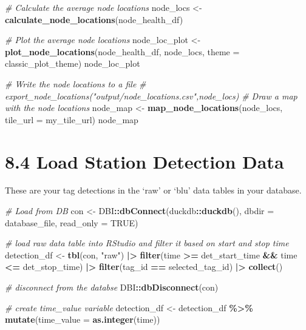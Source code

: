 \documentclass[
]{book}
\newenvironment{Shaded}{\begin{snugshade}}{\end{snugshade}}
\newcommand{\AttributeTok}[1]{\textcolor[rgb]{0.13,0.29,0.53}{#1}}
\newcommand{\CommentTok}[1]{\textcolor[rgb]{0.56,0.35,0.01}{\textit{#1}}}
\newcommand{\ConstantTok}[1]{\textcolor[rgb]{0.56,0.35,0.01}{#1}}
\newcommand{\FunctionTok}[1]{\textcolor[rgb]{0.13,0.29,0.53}{\textbf{#1}}}
\newcommand{\NormalTok}[1]{#1}
\newcommand{\OtherTok}[1]{\textcolor[rgb]{0.56,0.35,0.01}{#1}}
\newcommand{\SpecialCharTok}[1]{\textcolor[rgb]{0.81,0.36,0.00}{\textbf{#1}}}
\newcommand{\StringTok}[1]{\textcolor[rgb]{0.31,0.60,0.02}{#1}}
\begin{document}
\begin{Shaded}
\begin{Highlighting}[]
\CommentTok{\# Calculate the average node locations}
\NormalTok{node\_locs }\OtherTok{\textless{}{-}} \FunctionTok{calculate\_node\_locations}\NormalTok{(node\_health\_df)}

\CommentTok{\# Plot the average node locations}
\NormalTok{node\_loc\_plot }\OtherTok{\textless{}{-}} \FunctionTok{plot\_node\_locations}\NormalTok{(node\_health\_df, }
\NormalTok{                                     node\_locs, }
                                     \AttributeTok{theme =}\NormalTok{ classic\_plot\_theme)}
\NormalTok{node\_loc\_plot}

\CommentTok{\# Write the node locations to a file}
\CommentTok{\# export\_node\_locations("output/node\_locations.csv",node\_locs)}
\CommentTok{\# Draw a map with the node locations}
\NormalTok{node\_map }\OtherTok{\textless{}{-}} \FunctionTok{map\_node\_locations}\NormalTok{(node\_locs, }\AttributeTok{tile\_url =}\NormalTok{ my\_tile\_url)}
\NormalTok{node\_map}
\end{Highlighting}
\end{Shaded}

\section{8.4 Load Station Detection Data}\label{load-station-detection-data}

These are your tag detections in the `raw' or `blu' data tables in your database.

\begin{Shaded}
\begin{Highlighting}[]
\CommentTok{\# Load from DB}
\NormalTok{con }\OtherTok{\textless{}{-}}\NormalTok{ DBI}\SpecialCharTok{::}\FunctionTok{dbConnect}\NormalTok{(duckdb}\SpecialCharTok{::}\FunctionTok{duckdb}\NormalTok{(), }\AttributeTok{dbdir =}\NormalTok{ database\_file, }\AttributeTok{read\_only =} \ConstantTok{TRUE}\NormalTok{)}

\CommentTok{\# load raw data table into RStudio and filter it based on start and stop time}
\NormalTok{detection\_df }\OtherTok{\textless{}{-}} \FunctionTok{tbl}\NormalTok{(con, }\StringTok{"raw"}\NormalTok{) }\SpecialCharTok{|\textgreater{}}
  \FunctionTok{filter}\NormalTok{(time }\SpecialCharTok{\textgreater{}=}\NormalTok{ det\_start\_time }\SpecialCharTok{\&\&}\NormalTok{ time }\SpecialCharTok{\textless{}=}\NormalTok{ det\_stop\_time) }\SpecialCharTok{|\textgreater{}}
  \FunctionTok{filter}\NormalTok{(tag\_id }\SpecialCharTok{==}\NormalTok{ selected\_tag\_id) }\SpecialCharTok{|\textgreater{}}
  \FunctionTok{collect}\NormalTok{()}

\CommentTok{\# disconnect from the databse}
\NormalTok{DBI}\SpecialCharTok{::}\FunctionTok{dbDisconnect}\NormalTok{(con)}

\CommentTok{\# create time\_value variable}
\NormalTok{detection\_df }\OtherTok{\textless{}{-}}\NormalTok{ detection\_df }\SpecialCharTok{\%\textgreater{}\%} 
  \FunctionTok{mutate}\NormalTok{(}\AttributeTok{time\_value =} \FunctionTok{as.integer}\NormalTok{(time))}
\end{Highlighting}
\end{Shaded}
\end{document}
